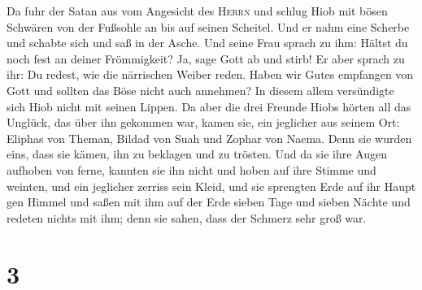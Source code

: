  Da fuhr der Satan aus vom Angesicht des \textsc{Herrn}
und schlug Hiob mit bösen Schwären von der Fußsohle an bis auf seinen
Scheitel.  Und er nahm eine Scherbe und schabte sich und
saß in der Asche.  Und seine Frau sprach zu ihm: Hältst du
noch fest an deiner Frömmigkeit? Ja, sage Gott ab und stirb!
 Er aber sprach zu ihr: Du redest, wie die närrischen
Weiber reden. Haben wir Gutes empfangen von Gott und sollten das Böse
nicht auch annehmen? In diesem allem versündigte sich Hiob nicht mit
seinen Lippen.  Da aber die drei Freunde Hiobs hörten all
das Unglück, das über ihn gekommen war, kamen sie, ein jeglicher aus
seinem Ort: Eliphas von Theman, Bildad von Suah und Zophar von Naema.
Denn sie wurden eins, dass sie kämen, ihn zu beklagen und zu trösten.
 Und da sie ihre Augen aufhoben von ferne, kannten sie
ihn nicht und hoben auf ihre Stimme und weinten, und ein jeglicher
zerriss sein Kleid, und sie sprengten Erde auf ihr Haupt gen Himmel
 und saßen mit ihm auf der Erde sieben Tage und sieben
Nächte und redeten nichts mit ihm; denn sie sahen, dass der Schmerz sehr
groß war.

\hypertarget{section-2}{%
\section{3}\label{section-2}}

